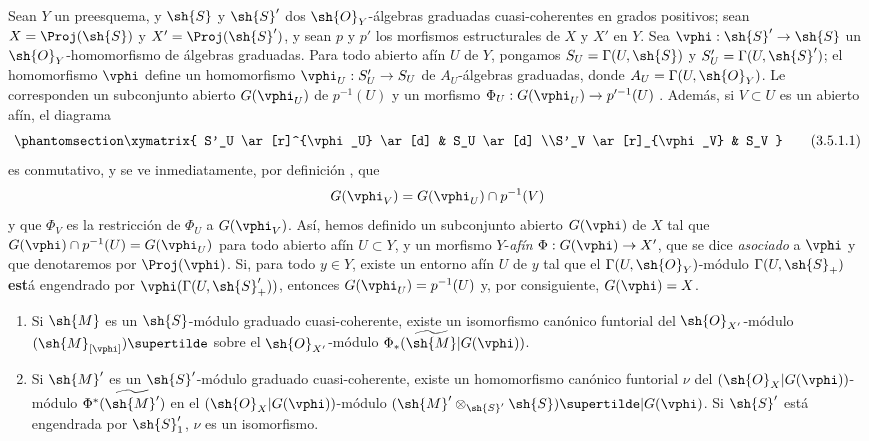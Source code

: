 \documentclass[oneside,10pt]{amsart}
\makeatletter
\newcommand{\ega@arrow}[2]{\mathchoice{#1}{#2}{#2}{#2}}
\renewcommand{\to}{\ega@arrow{\longrightarrow}{\rightarrow}}
\newcommand{\oldpage}[2][]{\marginnote{\normalfont\footnotesize\textbf{#1}~|~#2}\ignorespaces}
\let\EGAOriginalLabel\label
\renewcommand{\label}[1]{\phantomsection\EGAOriginalLabel{#1}}
\makeatother
\begin{document}
\begin{env}[3.5.1]
\label{II.3.5.1}
Sean $Y$ un preesquema, y $\sh{S}$ y $\sh{S}'$ dos $\sh{O}_Y$-álgebras graduadas cuasi-coherentes en grados positivos; sean $X=\Proj(\sh{S})$ y $X'=\Proj(\sh{S}')$, y sean $p$ y $p'$ los morfismos estructurales de $X$ y $X'$ en $Y$.
Sea $\vphi:\sh{S}'\to\sh{S}$ un $\sh{O}_Y$-homomorfismo de álgebras graduadas.
Para todo abierto afín $U$ de $Y$, pongamos $S_U=\Gamma(U,\sh{S})$ y $S'_U=\Gamma(U,\sh{S}')$; el homomorfismo $\vphi$ define un homomorfismo $\vphi_U:S'_U\to S_U$ de $A_U$-álgebras graduadas, donde $A_U=\Gamma(U,\sh{O}_Y)$.
Le corresponden un subconjunto abierto $G(\vphi_U)$ de $p^{-1}(U)$ y un morfismo $\Phi_U:G(\vphi_U)\to p'^{-1}(U)$ .
Además, si $V\subset U$ es un abierto afín, el diagrama
\[
\label{II.3.5.1.1}
  \xymatrix{
    S'_U \ar[r]^{\vphi_U} \ar[d]
    & S_U \ar[d]
  \\S'_V \ar[r]_{\vphi_V}
    & S_V
  }
\tag{3.5.1.1}
\]
es conmutativo, y se ve inmediatamente, por definición , que
\[
  G(\vphi_V)=G(\vphi_U)\cap p^{-1}(V)
\]
y que $\Phi_V$ es la restricción de $\Phi_U$ a $G(\vphi_V)$.
Así, hemos definido un subconjunto abierto $G(\vphi)$ de $X$ tal que $G(\vphi)\cap p^{-1}(U)=G(\vphi_U)$ para todo abierto afín $U\subset Y$, y un morfismo $Y$-\emph{afín} $\Phi:G(\vphi)\to X'$, que se dice \emph{asociado} a $\vphi$ y que denotaremos por $\Proj(\vphi)$.
\oldpage[II]{62}
Si, para todo $y\in Y$, existe un entorno afín $U$ de $y$ tal que el $\Gamma(U,\sh{O}_Y)$-módulo $\Gamma(U,\sh{S}_+)$ \textbf{est}á engendrado por $\vphi(\Gamma(U,\sh{S}'_+))$, entonces $G(\vphi_U)=p^{-1}(U)$ y, por consiguiente, $G(\vphi)=X$.
\end{env}

\begin{proposition}[3.5.2]
\label{II.3.5.2}
\medskip\noindent
\begin{enumerate}
  \item[(i)] Si $\sh{M}$ es un $\sh{S}$-módulo graduado cuasi-coherente, existe un isomorfismo canónico funtorial del $\sh{O}_{X'}$-módulo $(\sh{M}_{[\vphi]})\supertilde$ sobre el $\sh{O}_{X'}$-módulo $\Phi_*(\widetilde{\sh{M}}|G(\vphi))$.
  \item[(ii)] Si $\sh{M}'$ es un $\sh{S}'$-módulo graduado cuasi-coherente, existe un homomorfismo canónico funtorial $\nu$ del $(\sh{O}_X|G(\vphi))$-módulo $\Phi^*(\widetilde{\sh{M}'})$ en el $(\sh{O}_X|G(\vphi))$-módulo $(\sh{M}'\otimes_{\sh{S}'}\sh{S})\supertilde|G(\vphi)$.
    Si $\sh{S}'$ está engendrada por $\sh{S}'_1$, $\nu$ es un isomorfismo.
\end{enumerate}
\end{proposition}
\end{document}
